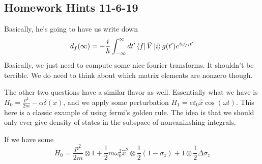 \documentclass{article}
\theoremstyle{definition}
\begin{document}
\subsection{Homework Hints 11-6-19}
Basically, he's going to have us write down 
\begin{equation}
	d_f(\infty)=-\frac{i}{\hbar}\int_{-\infty}^{\infty}dt'\bra{f}\hat V\ket{i}g(t')e^{i\omega_{fi}t'}
\end{equation}
Basically, we just need to compute some nice fourier transforms. It shouldn't be terrible.
We do need to think about which matrix elements are nonzero though.

The other two questions have a similar flavor as well.
Essentially what we have is $H_0=\frac{p^2}{2m}-\alpha\delta(x)$, and we apply some perturbation $H_1=e\varepsilon_0\hat x\cos(\omega t)$. This here is a classic example of using fermi's golden rule. The idea is that we should only ever give density of states in the subspace of nonvaninshing integrals.

If we have some 
\begin{equation}
	H_0=\frac{p^2}{2m}\otimes1+\frac{1}{2}m\omega_0^2\hat x^2\otimes\frac{1}{2}(1-\sigma_z)
	+1\otimes\frac{1}{2}\Delta\sigma_z
\end{equation}
\end{document}
